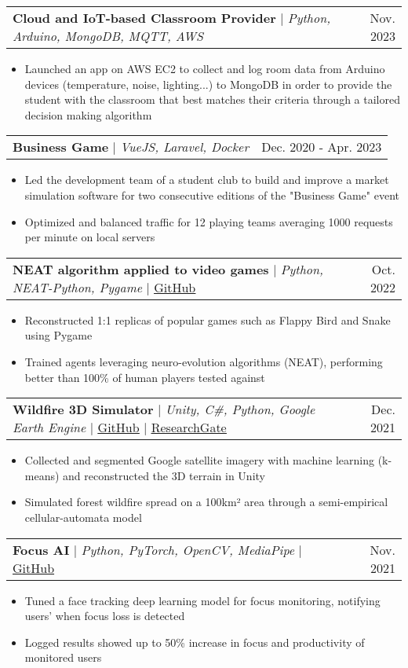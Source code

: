 \documentclass[letterpaper,10.5t]{article}
\makeatletter
\newcommand{\resumeItem}[1]{
  \item\small{
    {#1 \vspace{-2pt}}
  }
}
\newcommand{\resumeProjectHeading}[2]{
    \item
    \begin{tabular*}{0.97\textwidth}{l@{\extracolsep{\fill}}r}
      \small#1 & #2 \\
    \end{tabular*}\vspace{-7pt}
}
\newcommand{\resumeItemListStart}{\begin{itemize}}
\newcommand{\resumeItemListEnd}{\end{itemize}\vspace{-5pt}}
\makeatother
\begin{document}
        \resumeProjectHeading
        {\textbf{Cloud and IoT-based Classroom Provider} $|$ \emph{Python, Arduino, MongoDB, MQTT, AWS}}{Nov. 2023}
            \resumeItemListStart
                \resumeItem{Launched an app on AWS EC2 to collect and log room data from Arduino devices (temperature, noise, lighting...) to MongoDB in order to provide the student with the classroom that best matches their criteria through a tailored decision making algorithm }
            \resumeItemListEnd

        \resumeProjectHeading
        {\textbf{Business Game} $|$ \emph{VueJS, Laravel, Docker}}{Dec. 2020 - Apr. 2023}
            \resumeItemListStart
                \resumeItem{Led the development team of a student club to build and improve a market simulation software for two consecutive editions of the "Business Game" event}
                \resumeItem{Optimized and balanced traffic for 12 playing teams averaging 1000 requests per minute on local servers}
            \resumeItemListEnd
          
        \resumeProjectHeading
        {\textbf{NEAT algorithm applied to video games} $|$ \emph{Python, NEAT-Python, Pygame} $|$ \href{https://github.com/Somnef/snake_neat_ai}{\underline{GitHub}}}{Oct. 2022}
            \resumeItemListStart
                \resumeItem{Reconstructed 1:1 replicas of popular games such as Flappy Bird and Snake using Pygame}
                \resumeItem{Trained agents leveraging neuro-evolution algorithms (NEAT), performing better than 100\% of human players tested against}
            \resumeItemListEnd

        \resumeProjectHeading
            {\textbf{Wildfire 3D Simulator} $|$ \emph{Unity, C\#, Python, Google Earth Engine} $|$ \href{https://github.com/Somnef/semi-empirical-wildfire-simulation}{\underline{GitHub}} $|$ \href{https://www.researchgate.net/publication/354678516_Applying_semi-empirical_simulation_of_wildfire_on_real_world_satellite_imagery_data}{\underline{ResearchGate}}}{Dec. 2021}
                \resumeItemListStart
                    \resumeItem{Collected and segmented Google satellite imagery with machine learning (k-means) and reconstructed the 3D terrain in Unity}
                    \resumeItem{Simulated forest wildfire spread on a 100km² area through a semi-empirical cellular-automata model}
                \resumeItemListEnd

        \resumeProjectHeading
          {\textbf{Focus AI} $|$ \emph{Python, PyTorch, OpenCV, MediaPipe} $|$ \href{https://github.com/Somnef/focus-monitor-ai}{\underline{GitHub}}}{Nov. 2021}
          \resumeItemListStart
            \resumeItem{Tuned a face tracking deep learning model for focus monitoring, notifying users' when focus loss is detected }
            \resumeItem{Logged results showed up to 50\% increase in focus and productivity of monitored users} 
          \resumeItemListEnd
\end{document}

